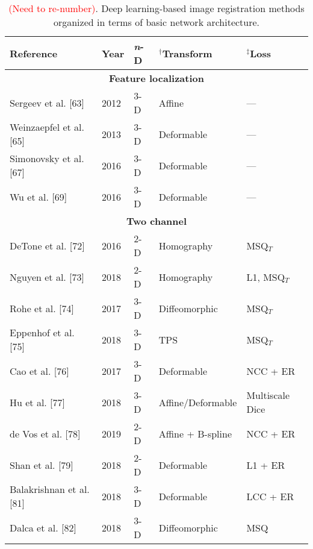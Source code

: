 \begin{table}[!htb]
\centering
\small
\caption{\textcolor{red}{(Need to re-number)}.  Deep learning-based image registration methods organized in terms of basic
         network architecture.}
\label{table:methods}
\begin{tabular*}{\textwidth}{l@{\extracolsep{\fill}}l@{\extracolsep{\fill}}l@{\extracolsep{\fill}}l@{\extracolsep{\fill}}l}
\toprule
\midrule
\textbf{Reference} & \textbf{Year} & \textbf{\textit{n}-D} & $^\dagger$\textbf{Transform} & $^\ddagger$\textbf{Loss} \\
\midrule
\midrule
\multicolumn{5}{c}{\textbf{Feature localization}}
  \vspace{0.25cm} \\
  Sergeev et al. [63] & 2012 & 3-D & Affine & --- \\
  Weinzaepfel et al. [65] & 2013 & 3-D & Deformable & --- \\
  Simonovsky et al. [67] & 2016 & 3-D & Deformable & --- \\
  Wu et al. [69] & 2016 & 3-D & Deformable & --- \\
\midrule
\multicolumn{5}{c}{\textbf{Two channel}}
  \vspace{0.25cm} \\
  DeTone et al. [72] & 2016 & 2-D & Homography & MSQ$_T$ \\ %
  Nguyen et al. [73] & 2018 & 2-D & Homography & L1, MSQ$_T$ \\ %
  Rohe et al. [74] & 2017 & 3-D & Diffeomorphic & MSQ$_T$ \\  %
  Eppenhof et al. [75] & 2018 & 3-D & TPS & MSQ$_T$ \\       %
  Cao et al. [76] & 2017 & 3-D & Deformable & NCC + ER \\
  Hu et al. [77] & 2018 & 3-D & Affine/Deformable & Multiscale Dice \\
  de Vos et al. [78] & 2019 & 2-D & Affine + B-spline & NCC + ER \\
  Shan et al. [79] & 2018 & 2-D & Deformable & L1 + ER \\
  Balakrishnan et al. [81] & 2018 & 3-D & Deformable & LCC + ER \\
  Dalca et al. [82] & 2018 & 3-D & Diffeomorphic & MSQ \\

\end{tabular*}
\end{table}
